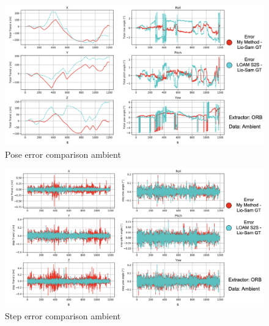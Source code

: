 {    \begin{figure}[ht]
        \centering
        \includegraphics[scale = 0.25]{images/comparison_appendix/pose_error_ambient.png}
        \caption{Pose error comparison ambient}
        \label{fig:pose_error_comparison_ambient}
    \end{figure}
    
    \begin{figure}[ht]
        \centering
        \includegraphics[scale = 0.25]{images/comparison_appendix/step_error_ambient.png}
        \caption{Step error comparison ambient}
        \label{fig:step_error_comparison_ambient}
    \end{figure}
    \clearpage
}



